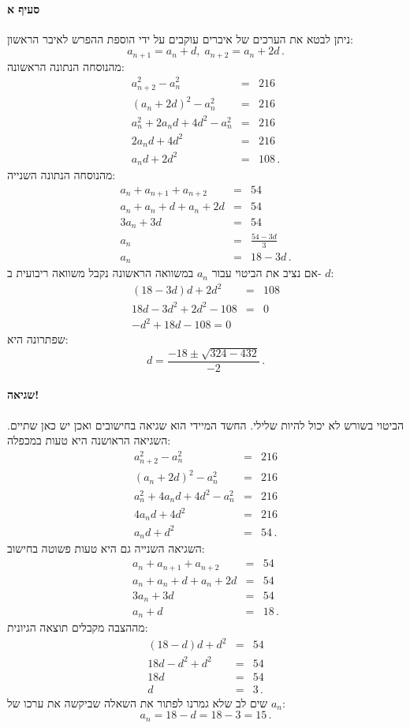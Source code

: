 \documentclass[12pt,a4paper]{article}
\begin{document}
\vspace{-4ex}\paragraph{סעיף א}
ניתן לבטא את הערכים של איברים עוקבים על ידי הוספת ההפרש לאיבר הראשון:
\[
a_{n+1} = a_n + d, \; a_{n+2} = a_n + 2d\,.
\]
מהנוסחה הנתונה הראשונה:
\begin{eqnarray*}
a^2_{n+2} - a^2_n &=& 216\\
(a_n + 2d)^2 - a^2_n &=& 216\\
a_n^2 + 2a_nd + 4d^2 - a^2_n &=& 216\\
2a_nd + 4d^2 &=& 216\\
a_nd + 2d^2 &=& 108\,.
\end{eqnarray*}
מהנוסחה הנתונה השנייה:
\begin{eqnarray*}
a_n + a_{n+1} + a_{n+2} &=& 54\\
a_n + a_n + d + a_n + 2d &=& 54\\
3a_n + 3d &=& 54\\
a_n &=& \frac{54-3d}{3}\\
a_n &=& 18-3d\,.
\end{eqnarray*}
אם נציב את הביטוי עבור $a_n$ במשוואה הראשונה נקבל משוואה ריבועית ב- $d$:
\begin{eqnarray*}
(18-3d)d + 2d^2 &=& 108\\
18d-3d^2+2d^2-108&=&0\\
-d^2 + 18d - 108 = 0
\end{eqnarray*}
שפתרונה היא:
\[
d = \frac{-18 \pm \sqrt{324-432}}{-2}\,.
\]

\vspace{-4ex}\paragraph{שגיאה!}

הביטוי בשורש לא יכול להיות שלילי. החשד המיידי הוא שגיאה בחישובים ואכן יש כאן שתיים. השגיאה הראושנה היא טעות במכפלה:
\begin{eqnarray*}
a^2_{n+2} - a^2_n &=& 216\\
(a_n + 2d)^2 - a^2_n &=& 216\\
a_n^2 + 4a_nd + 4d^2 - a^2_n &=& 216\\
4a_nd + 4d^2 &=& 216\\
a_nd + d^2 &=& 54\,.
\end{eqnarray*}
השגיאה השנייה גם היא טעות פשוטה בחישוב:
\begin{eqnarray*}
a_n + a_{n+1} + a_{n+2} &=& 54\\
a_n + a_n + d + a_n + 2d &=& 54\\
3a_n + 3d &=& 54\\
a_n + d &=& 18\,.
\end{eqnarray*}
מההצבה מקבלים תוצאה הגיונית:
\begin{eqnarray*}
(18-d)d + d^2 &=& 54\\
18d - d^2 + d^2 &=& 54\\
18d &=& 54\\
d &=& 3\,.
\end{eqnarray*}
שים לב שלא גמרנו לפתור את השאלה שביקשה את ערכו של $a_n$:
\[
a_n=18-d=18-3=15\,.
\]
\end{document}
